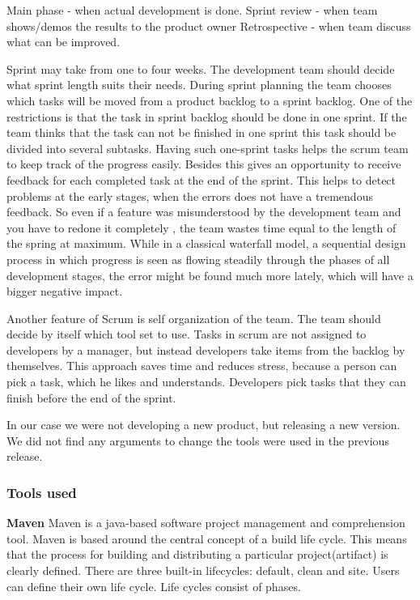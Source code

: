   Main phase - when actual development is done.
  Sprint review - when team shows/demos the results to the product owner
  Retrospective - when team discuss what can be improved.


  Sprint may take from one to four weeks. The development team should decide
  what sprint length suits their needs. During sprint planning the team chooses
  which tasks will be moved from a product backlog to a sprint backlog.
  One of the restrictions is that the task in sprint backlog should be done in one sprint.
  If the team thinks that the task can not be finished in one sprint this task
  should be divided into several subtasks. 
  Having such one-sprint tasks helps the scrum team to keep track of the
  progress easily. Besides this gives an opportunity to receive feedback for each completed task at the end
  of the sprint. This helps to detect problems at the early stages, when
  the errors does not have a tremendous feedback. So even if a feature was misunderstood by the development team
  and you have to redone it completely , the team wastes time equal to the
  length of the spring at maximum. While in a classical waterfall model, a sequential design process in which
  progress is seen as flowing steadily through the phases of all development stages, 
  the error might be found much more lately, which will have a bigger negative impact.

  Another feature of Scrum is self organization of the team. The team should
  decide by itself which tool set to use. Tasks in scrum are not assigned to
  developers by a manager, but instead developers take items from the backlog by themselves.
  This approach saves time and reduces stress, because a person can pick a task,
  which he likes and understands. Developers pick tasks that they
  can finish before the end of the sprint.

  In our case we were not developing a new product, but releasing a new version.
  We did not find any arguments to change the tools were used in the previous
  release.

  \subsubsection {Tools used}
  
  \textbf{Maven}
  Maven is a java-based software project management and comprehension tool.
  Maven is based around the central concept of a build life cycle. This means
  that the process for building and distributing a particular project(artifact) is clearly defined. There are three built-in lifecycles:
  default, clean and site. Users can define their own life cycle. Life cycles
  consist of phases.
   
